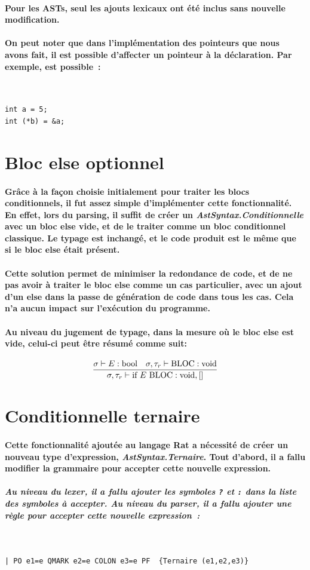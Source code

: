 \documentclass[french]{article}
\newcommand{\jugementElseOpt}{
        \dfrac{\sigma \vdash E : \text{bool} \hspace*{10pt} \sigma, \tau_r \vdash \text{BLOC} : \text{void}}
              {\sigma, \tau_r \vdash \text{if } E \text{ BLOC} : \text{void}, []}
        }
\begin{document}
\paragraph*{Pour les ASTs, seul les ajouts lexicaux ont été inclus sans nouvelle modification.}

\paragraph*{On peut noter que dans l'implémentation des pointeurs que nous avons fait, il est possible d'affecter un pointeur à la déclaration.
Par exemple, est possible~:}
\,
\begin{lstlisting}[language=ratcode]
int a = 5;
int (*b) = &a;
\end{lstlisting}

\section{Bloc else optionnel}
\paragraph*{Grâce à la façon choisie initialement pour traiter les blocs conditionnels, il fut assez simple d'implémenter cette fonctionnalité.
En effet, lors du parsing, il suffit de créer un \emph{AstSyntax.Conditionnelle} avec un bloc else vide, et de le traiter comme un bloc conditionnel classique.
Le typage est inchangé, et le code produit est le même que si le bloc else était présent.}
\paragraph*{Cette solution permet de minimiser la redondance de code, et de ne pas avoir à traiter le bloc else comme un cas particulier, avec
un ajout d'un else dans la passe de génération de code dans tous les cas. Cela n'a aucun impact sur l'exécution du programme.}
\paragraph*{Au niveau du jugement de typage, dans la mesure où le bloc else est vide, celui-ci peut être résumé comme suit:}
\[\jugementElseOpt\]

\section{Conditionnelle ternaire}
\paragraph*{Cette fonctionnalité ajoutée au langage Rat a nécessité de créer un nouveau type d'expression, \emph{AstSyntax.Ternaire}.
Tout d'abord, il a fallu modifier la grammaire pour accepter cette nouvelle expression.}
\subparagraph*{Au niveau du lexer, il a fallu ajouter les symboles \texttt{?} et \texttt{:} dans la liste des symboles à accepter. Au niveau du parser, il a fallu ajouter une règle pour accepter cette nouvelle expression~:}
\,%
\begin{lstlisting}
| PO e1=e QMARK e2=e COLON e3=e PF  {Ternaire (e1,e2,e3)}
\end{lstlisting}
\end{document}
